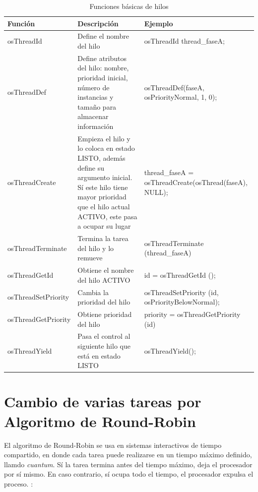 \documentclass[12pt, twoside]{report}
\begin{document}
\begin{table}[H]
	\begin{tabularx}{15cm}{|X|X|X|}
		\hline
		\rowcolor[gray]{0.8}Función & Descripción & Ejemplo\\
		\hline
		\rowcolor[gray]{1}osThreadId & Define el nombre del hilo & osThreadId thread\_faseA;\\
		\hline
		\rowcolor[gray]{0.8}osThreadDef & Define atributos del hilo: nombre, prioridad inicial, número de instancias y
		tamaño para almacenar información & osThreadDef(faseA, osPriorityNormal, 1, 0); \\
		\hline
		\rowcolor[gray]{1}osThreadCreate & Empieza el hilo y lo coloca en estado LISTO, además define su argumento inicial. Sí este hilo tiene mayor prioridad que el hilo actual ACTIVO, este pasa a ocupar su lugar & thread\_faseA = osThreadCreate(osThread(faseA), NULL);\\
		\hline
		\rowcolor[gray]{0.8}osThreadTerminate & Termina la tarea del hilo y lo remueve & osThreadTerminate (thread\_faseA)\\
		\hline
		\rowcolor[gray]{1}osThreadGetId & Obtiene el nombre del hilo ACTIVO & id = osThreadGetId ();\\
		\hline
		\rowcolor[gray]{0.8}osThreadSetPriority & Cambia la prioridad del hilo & osThreadSetPriority (id, osPriorityBelowNormal);\\
		\hline
		\rowcolor[gray]{1}osThreadGetPriority & Obtiene prioridad del hilo & priority = osThreadGetPriority (id) \\
		\hline
		\rowcolor[gray]{0.8}osThreadYield & Pasa el control al siguiente hilo que está en estado LISTO & osThreadYield(); \\
		\hline
	\end{tabularx}
	\caption{Funciones básicas de hilos}
	\label{tabla2:001}
\end{table}

\section{Cambio de varias tareas por Algoritmo de Round-Robin}

El algoritmo de Round-Robin se usa en sistemas interactivos de tiempo compartido, en donde cada tarea puede realizarse en un tiempo máximo definido, llamdo \textit{cuantum}. Sí la tarea termina antes del tiempo máximo, deja el procesador por sí mismo. En caso contrario, sí ocupa todo el tiempo, el procesador expulsa el proceso.  \cite{Cobo}: 
\end{document}
